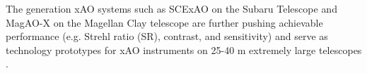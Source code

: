 \documentclass[twocolumn]{aa}
\newcommand{\olivier}[1]{\textcolor{orange}{#1}}
\newcommand{\og}[2]{\textcolor{orange}{\sout{#1} {#2}}}
\begin{document}
The generation xAO systems such as SCExAO on the Subaru Telescope \citep{Jovanovic2015} and MagAO-X on the Magellan Clay telescope \citep{Males2018MagAOx} are further pushing achievable performance (e.g. Strehl ratio (SR), contrast, and sensitivity) and serve as technology prototypes for xAO instruments on 25-40 m extremely large telescopes \citep{Kasper_PCS,TMTwhitepaper_Fitzgerald, GMT_2020}.

\end{document}
